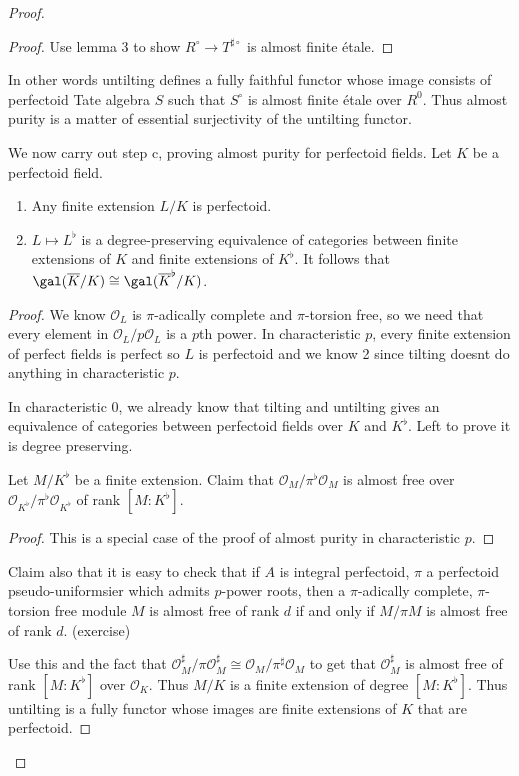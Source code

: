 \documentclass[a4paper]{article}
\newcommand{\tilt}{\flat} %
\renewcommand*{\O}{\mathcal{O}}
\renewcommand*{\O}{\mathcal{O}}
\begin{document}
\begin{proof}
\begin{proof}
    Use lemma 3 to show \(R^\circ \to T^{\sharp \circ}\) is almost finite étale.
  \end{proof}

  In other words untilting defines a fully faithful functor whose image consists of perfectoid Tate algebra \(S\) such that \(S^\circ\) is almost finite étale over \(R^0\). Thus almost purity is a matter of essential surjectivity of the untilting functor.

  We now carry out step c, proving almost purity for perfectoid fields. Let \(K\) be a perfectoid field. 
  \begin{enumerate}
  \item Any finite extension \(L/K\) is perfectoid.
  \item \(L \mapsto L^\tilt\) is a degree-preserving equivalence of categories between finite extensions of \(K\) and finite extensions of \(K^\tilt\). It follows that \(\gal(\overline K/K) \cong \gal(\overline K^\tilt/K)\).
  \end{enumerate}

  \begin{proof}
    We know \(\O_L\) is \(\pi\)-adically complete and \(\pi\)-torsion free, so we need that every element in \(\O_L/p \O_L\) is a \(p\)th power. In characteristic \(p\), every finite extension of perfect fields is perfect so \(L\) is perfectoid and we know 2 since tilting doesnt do anything in characteristic \(p\).

    In characteristic \(0\), we already know that tilting and untilting gives an equivalence of categories between perfectoid fields over \(K\) and \(K^\tilt\). Left to prove it is degree preserving.

    Let \(M/K^\tilt\) be a finite extension. Claim that \(\O_M/\pi^\tilt \O_M\) is almost free over \(\O_{K^\tilt}/\pi^\tilt \O_{K^\tilt}\) of rank \([M : K^\tilt]\).

    \begin{proof}
      This is a special case of the proof of almost purity in characteristic \(p\).
    \end{proof}

    Claim also that it is easy to check that if \(A\) is integral perfectoid, \(\pi\) a perfectoid pseudo-uniformsier which admits \(p\)-power roots, then a \(\pi\)-adically complete, \(\pi\)-torsion free module \(M\) is almost free of rank \(d\) if and only if \(M/\pi M\) is almost free of rank \(d\). (exercise)

    Use this and the fact that \(\O^\sharp_M/\pi \O_M^\sharp \cong \O_M/\pi^\sharp \O_M\) to get that \(\O_M^\sharp\) is almost free of rank \([M : K^\tilt]\) over \(\O_K\). Thus \(M/K\) is a finite extension of degree \([M : K^\tilt]\). Thus untilting is a fully functor whose images are finite extensions of \(K\) that are perfectoid.


\end{proof}
\end{proof}
\end{document}
